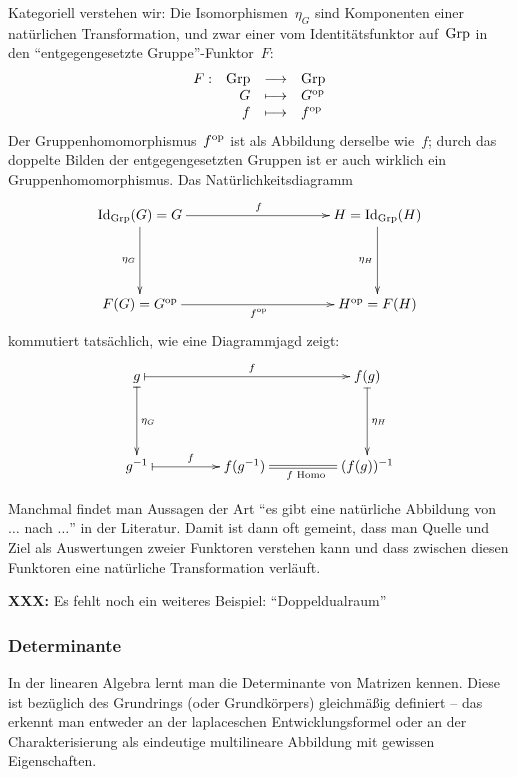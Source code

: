 Kategoriell verstehen wir: Die Isomorphismen~$\eta_G$ sind Komponenten einer
natürlichen Transformation, und zwar einer vom Identitätsfunktor auf~$\mathrm{Grp}$ in
den "`entgegengesetzte Gruppe"'-Funktor~$F$:
\[ \begin{array}{@{}rrcl@{}}
  F : & \Grp &\longrightarrow& \Grp \\
  & G &\longmapsto& G^\op \\
  & f &\longmapsto& f^\op
\end{array} \]
Der Gruppenhomomorphismus~$f^{\mathrm{op}}$ ist als Abbildung derselbe wie~$f$; durch das
doppelte Bilden der entgegengesetzten Gruppen ist er auch wirklich ein
Gruppenhomomorphismus. Das Natürlichkeitsdiagramm
\[ \xymatrixcolsep{4pc}\xymatrixrowsep{4pc}\xymatrix{
  \Id_\Grp(G)=G \ar[rr]^{f} \ar[d]_{\eta_G} && H=\Id_\Grp(H) \ar[d]_{\eta_H} \\
  F(G)=G^\op \ar[rr]_{f^\op} && H^\op=F(H)
} \]
kommutiert tatsächlich, wie eine Diagrammjagd zeigt:
\[ \xymatrixcolsep{4pc}\xymatrixrowsep{4pc}\xymatrix{
  g \ar@{|->}^f[rr] \ar@{|->}^{\eta_G}[d] & & f(g) \ar@{|->}^{\eta_H}[d] \\
  g^{-1} \ar@{|->}^f[r]  & f(g^{-1}) \ar@{=}_{\text{$f$ Homo}}[r] & (f(g))^{-1}
} \]


\begin{bem}\label{interpretnat}%
Manchmal findet man Aussagen der Art "`es gibt eine natürliche Abbildung
von $\ldots$ nach $\ldots$"' in der Literatur. Damit ist dann oft gemeint, dass
man Quelle und Ziel als Auswertungen zweier Funktoren verstehen kann und dass
zwischen diesen Funktoren eine natürliche Transformation verläuft.\end{bem}

\textbf{XXX:} Es fehlt noch ein weiteres Beispiel:
"`Doppeldualraum"'


\subsubsection*{Determinante}

In der linearen Algebra lernt man die Determinante von Matrizen kennen. Diese
ist bezüglich des Grundrings (oder Grundkörpers) gleichmäßig definiert -- das
erkennt man entweder an der laplaceschen Entwicklungsformel oder an der
Charakterisierung als eindeutige multilineare Abbildung mit gewissen
Eigenschaften.

